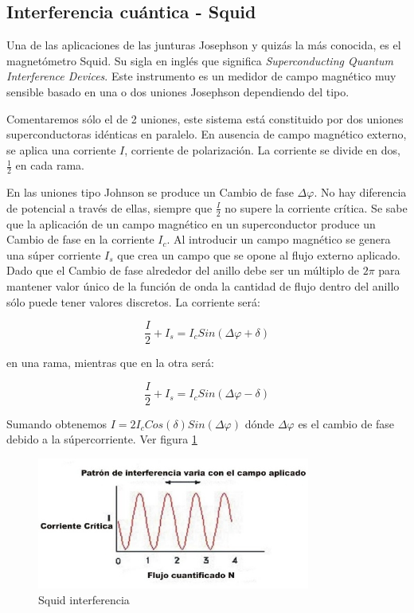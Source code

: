 \subsection{Interferencia cuántica - Squid}

Una de las aplicaciones de las junturas Josephson y quizás la más conocida, es el magnetómetro Squid. Su sigla en inglés que significa \textit{Superconducting Quantum Interference Devices}. Este instrumento es un medidor de campo magnético muy sensible basado en una o dos uniones Josephson dependiendo del tipo.

Comentaremos sólo el de 2 uniones, este sistema está constituido por dos uniones superconductoras idénticas en paralelo. En ausencia de campo magnético externo, se aplica una corriente $I$, corriente de polarización. La corriente se divide en dos, $\frac{1}{2}$ en cada rama.

En las uniones tipo Johnson se produce un Cambio de fase $\Delta\varphi$. No hay diferencia de potencial a través de ellas, siempre que $\frac{I}{2}$ no supere la corriente crítica. Se sabe que la aplicación de un campo magnético en un superconductor produce un Cambio de fase en la corriente $I_{c}$. Al introducir un campo magnético se genera una súper corriente $I_{s}$ que crea un campo que se opone al flujo externo aplicado. Dado que el Cambio de fase alrededor del anillo debe ser un múltiplo de $2\pi$ para mantener valor único de la función de onda la cantidad de flujo dentro del anillo sólo puede tener valores discretos. La corriente será:

\begin{equation*}
	\frac{I}{2}+ I_{s} = I_{c} Sin(\Delta\varphi+\delta)
\end{equation*}

en una rama, mientras que en la otra será:

\begin{equation*}
	\frac{I}{2}+ I_{s} = I_{c} Sin(\Delta\varphi-\delta)
\end{equation*}

Sumando obtenemos $I = 2I_{c}Cos(\delta)Sin(\Delta\varphi)$ dónde $\Delta\varphi$ es el cambio de fase debido a la súpercorriente. Ver figura \ref{fig:442b}

\begin{figure}[H]
    \centering
    \includegraphics[width=0.8\textwidth]{./Figures/fig442b}
	\caption{Squid interferencia}
	\label{fig:442b}
\end{figure}


